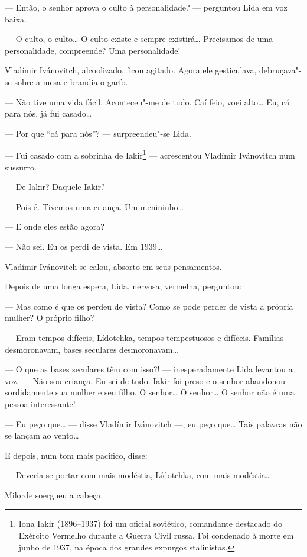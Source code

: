 --- Então, o senhor aprova o culto à personalidade? --- perguntou Lida
em voz baixa.

--- O culto, o culto\ldots{} O culto existe e sempre existirá\ldots{} Precisamos
de uma personalidade, compreende? Uma personalidade!

Vladímir Ivánovitch, alcoolizado, ficou agitado. Agora ele gesticulava,
debruçava"-se sobre a mesa e brandia o garfo.

--- Não tive uma vida fácil. Aconteceu"-me de tudo. Caí feio, voei
alto\ldots{} Eu, cá para nós, já fui casado\ldots{}

--- Por que ``cá para nós''? --- surpreendeu"-se Lida.

--- Fui casado com a sobrinha de Iakir\footnote{Iona Iakir (1896--1937)
  foi um oficial soviético, comandante destacado do Exército Vermelho
  durante a Guerra Civil russa. Foi condenado à morte em junho de 1937,
  na época dos grandes expurgos stalinistas.} --- acrescentou Vladímir
Ivánovitch num sussurro.

--- De Iakir? Daquele Iakir?

--- Pois é. Tivemos uma criança. Um menininho\ldots{}

--- E onde eles estão agora?

--- Não sei. Eu os perdi de vista. Em 1939\ldots{}

Vladímir Ivánovitch se calou, absorto em seus pensamentos.

Depois de uma longa espera, Lida, nervosa, vermelha, perguntou:

--- Mas como é que os perdeu de vista? Como se pode perder de vista a
própria mulher? O próprio filho?

--- Eram tempos difíceis, Lídotchka, tempos tempestuosos e difíceis.
Famílias desmoronavam, bases seculares desmoronavam\ldots{}

--- O que as bases seculares têm com isso?! --- inesperadamente Lida
levantou a voz. --- Não sou criança. Eu sei de tudo. Iakir foi preso e o
senhor abandonou sordidamente sua mulher e seu filho. O senhor\ldots{} O
senhor\ldots{} O senhor não é uma pessoa interessante!

--- Eu peço que\ldots{} --- disse Vladímir Ivánovitch ---, eu peço que\ldots{}
Tais palavras não se lançam ao vento\ldots{}

E depois, num tom mais pacífico, disse:

--- Deveria se portar com mais modéstia, Lídotchka, com mais modéstia\ldots{}

Milorde soergueu a cabeça.


